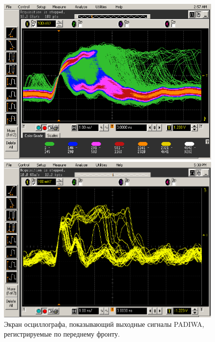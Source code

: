 \begin{figure}[H]
\begin{minipage}[b]{0.495\textwidth}
\includegraphics[width=1.0\textwidth]{pictures/28_Scope_additional.png}
\end{minipage}
\hspace{0.01\textwidth}
\begin{minipage}[b]{0.495\textwidth}
\includegraphics[width=1.0\textwidth]{pictures/28_Scope2.png}
\end{minipage}
\caption{Экран осциллографа, показывающий выходные сигналы PADIWA, регистрируемые по переднему фронту.}
\label{fig:ToTscope}
\end{figure}

